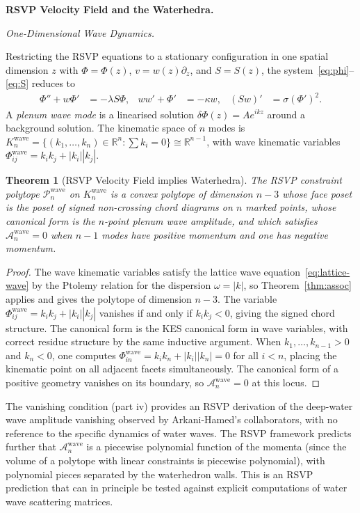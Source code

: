 \documentclass[12pt, oneside]{amsart}
\theoremstyle{plain}
\newtheorem{theorem}{Theorem}[section]
\theoremstyle{definition}
\theoremstyle{remark}
\newcommand{\R}{\mathbb{R}}
\newcommand{\Phif}{\Phi}
\newcommand{\vf}{v}
\newcommand{\Sf}{S}
\newcommand{\Amp}{\mathcal{A}}
\begin{document}
\bigskip\noindent\textbf{RSVP Velocity Field and the Waterhedra.}
\label{sec:water}

\medskip\noindent\textit{One-Dimensional Wave Dynamics.}

Restricting the RSVP equations to a stationary configuration in one spatial dimension $z$ with $\Phif = \Phif(z)$, $\vf = w(z)\partial_z$, and $\Sf = \Sf(z)$, the system~\eqref{eq:phi}--\eqref{eq:S} reduces to
\begin{align*}
  \Phif'' + w\Phif' &= -\lambda \Sf\Phif, &
  ww' + \Phif' &= -\kappa w, &
  (\Sf w)' &= \sigma(\Phif')^2.
\end{align*}
A \emph{plenum wave mode} is a linearised solution $\delta\Phif(z) = A e^{ikz}$ around a background solution. The kinematic space of $n$ modes is $K_n^{\mathrm{wave}} = \{(k_1,\ldots,k_n) \in \R^n : \sum k_i = 0\} \cong \R^{n-1}$, with wave kinematic variables $\Phif_{ij}^{\mathrm{wave}} = k_ik_j + |k_i||k_j|$.

\begin{theorem}[RSVP Velocity Field implies Waterhedra]
\label{thm:water}
The RSVP constraint polytope $\mathcal{P}_n^{\mathrm{wave}}$ on $K_n^{\mathrm{wave}}$ is a convex polytope of dimension $n-3$ whose face poset is the poset of signed non-crossing chord diagrams on $n$ marked points, whose canonical form is the $n$-point plenum wave amplitude, and which satisfies $\Amp_n^{\mathrm{wave}} = 0$ when $n-1$ modes have positive momentum and one has negative momentum.
\end{theorem}

\begin{proof}
The wave kinematic variables satisfy the lattice wave equation~\eqref{eq:lattice-wave} by the Ptolemy relation for the dispersion $\omega = |k|$, so Theorem~\ref{thm:assoc} applies and gives the polytope of dimension $n-3$. The variable $\Phif_{ij}^{\mathrm{wave}} = k_ik_j + |k_i||k_j|$ vanishes if and only if $k_ik_j < 0$, giving the signed chord structure. The canonical form is the KES canonical form in wave variables, with correct residue structure by the same inductive argument. When $k_1,\ldots,k_{n-1} > 0$ and $k_n < 0$, one computes $\Phif_{in}^{\mathrm{wave}} = k_i k_n + |k_i||k_n| = 0$ for all $i < n$, placing the kinematic point on all adjacent facets simultaneously. The canonical form of a positive geometry vanishes on its boundary, so $\Amp_n^{\mathrm{wave}} = 0$ at this locus.
\end{proof}

The vanishing condition (part iv) provides an RSVP derivation of the deep-water wave amplitude vanishing observed by Arkani-Hamed's collaborators, with no reference to the specific dynamics of water waves. The RSVP framework predicts further that $\Amp_n^{\mathrm{wave}}$ is a piecewise polynomial function of the momenta (since the volume of a polytope with linear constraints is piecewise polynomial), with polynomial pieces separated by the waterhedron walls. This is an RSVP prediction that can in principle be tested against explicit computations of water wave scattering matrices.
\end{document}
